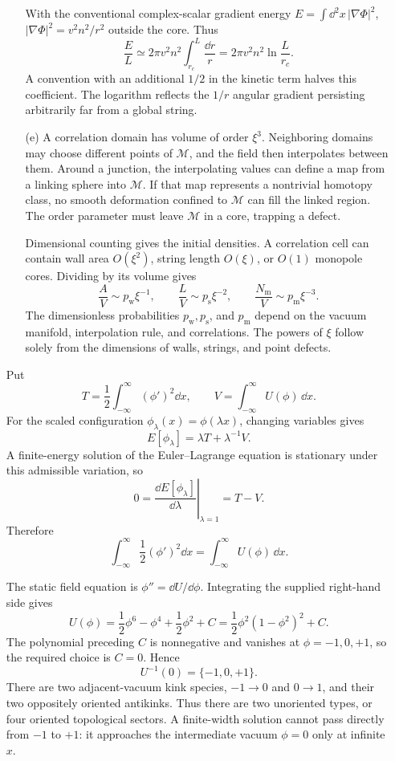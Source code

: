 \begin{enumerate}
\begin{enumerate}
    With the conventional complex-scalar gradient energy
    \(E=\int \dd^2x\,\lvert\nabla\Phi\rvert^2\),
    \(\lvert\nabla\Phi\rvert^2=v^2n^2/r^2\) outside the core.  Thus
    \[
      \frac EL
        \simeq 2\pi v^2n^2
         \int_{r_c}^{L}\frac{\dd r}{r}
        =2\pi v^2n^2\ln\frac{L}{r_c}.
    \]
    A convention with an additional \(1/2\) in the kinetic term halves
    this coefficient.  The logarithm reflects the \(1/r\) angular
    gradient persisting arbitrarily far from a global string.
    \item[(e)]
    A correlation domain has volume of order \(\xi^3\).  Neighboring
    domains may choose different points of \(\mathcal M\), and the field
    then interpolates between them.  Around a junction, the interpolating
    values can define a map from a linking sphere into \(\mathcal M\).
    If that map represents a nontrivial homotopy class, no smooth
    deformation confined to \(\mathcal M\) can fill the linked region.
    The order parameter must leave \(\mathcal M\) in a core, trapping a
    defect.

    Dimensional counting gives the initial densities.  A correlation
    cell can contain wall area \(O(\xi^2)\), string length \(O(\xi)\), or
    \(O(1)\) monopole cores.  Dividing by its volume gives
    \[
      \boxed{\frac AV\sim p_{\mathrm w}\xi^{-1},\qquad
        \frac LV\sim p_{\mathrm s}\xi^{-2},\qquad
        \frac{N_{\mathrm m}}V\sim p_{\mathrm m}\xi^{-3}.}
    \]
    The dimensionless probabilities \(p_{\mathrm w},p_{\mathrm s}\), and
    \(p_{\mathrm m}\) depend on the vacuum manifold, interpolation rule,
    and correlations.  The powers of \(\xi\) follow solely from the
    dimensions of walls, strings, and point defects.
  \end{enumerate}

  Put
  \[
    T=\frac12\int_{-\infty}^{\infty}(\phi')^2\dd x,
    \qquad
    V=\int_{-\infty}^{\infty}U(\phi)\,\dd x.
  \]
  For the scaled configuration \(\phi_\lambda(x)=\phi(\lambda x)\),
  changing variables gives
  \[
    E[\phi_\lambda]=\lambda T+\lambda^{-1}V.
  \]
  A finite-energy solution of the Euler--Lagrange equation is stationary
  under this admissible variation, so
  \[
    0=\left.\frac{\dd E[\phi_\lambda]}{\dd\lambda}\right|_{\lambda=1}
      =T-V.
  \]
  Therefore
  \[
    \boxed{\int_{-\infty}^{\infty}
      \frac12(\phi')^2\dd x
      =\int_{-\infty}^{\infty}U(\phi)\,\dd x.}
  \]

  The static field equation is \(\phi''=\dd U/\dd\phi\).  Integrating the
  supplied right-hand side gives
  \[
    U(\phi)=\frac12\phi^6-\phi^4+\frac12\phi^2+C
      =\frac12\phi^2(1-\phi^2)^2+C.
  \]
  The polynomial preceding \(C\) is nonnegative and vanishes at
  \(\phi=-1,0,+1\), so the required choice is \(C=0\).  Hence
  \[
    \boxed{U^{-1}(0)=\{-1,0,+1\}.}
  \]
  There are two adjacent-vacuum kink species,
  \(-1\to0\) and \(0\to1\), and their two oppositely oriented
  antikinks.  Thus there are two unoriented types, or four oriented
  topological sectors.  A finite-width solution cannot pass directly
  from \(-1\) to \(+1\): it approaches the intermediate vacuum
  \(\phi=0\) only at infinite \(x\).


\end{enumerate}
